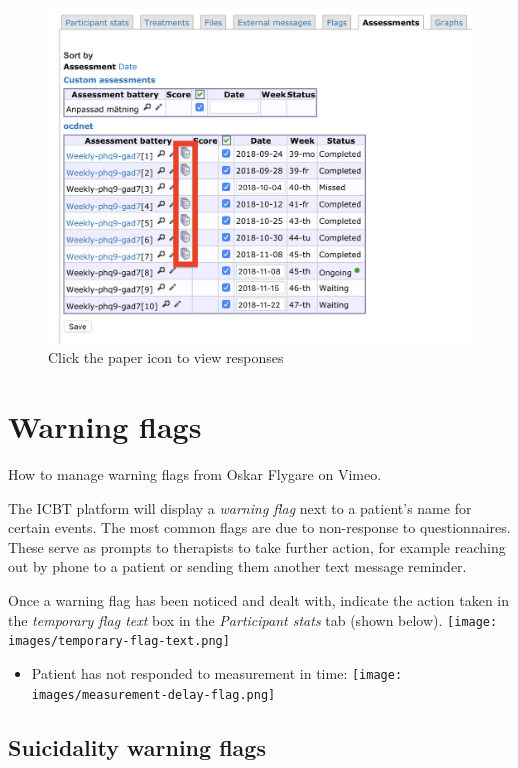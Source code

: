 \documentclass[]{book}
\providecommand{\tightlist}{%
  \setlength{\itemsep}{0pt}\setlength{\parskip}{0pt}}
\begin{document}
\begin{figure}
\centering
\includegraphics{images/assessments-list.png}
\caption{Click the paper icon to view responses}
\end{figure}

\hypertarget{warning-flags}{%
\section{Warning flags}\label{warning-flags}}

How to manage warning flags from Oskar Flygare on Vimeo.

The ICBT platform will display a \emph{warning flag} next to a patient's name for certain events. The most common flags are due to non-response to questionnaires. These serve as prompts to therapists to take further action, for example reaching out by phone to a patient or sending them another text message reminder.

Once a warning flag has been noticed and dealt with, indicate the action taken in the \emph{temporary flag text} box in the \emph{Participant stats} tab (shown below).
\texttt{[image: images/temporary-flag-text.png]}

\begin{itemize}
\tightlist
\item
  Patient has not responded to measurement in time: \texttt{[image: images/measurement-delay-flag.png]}
\end{itemize}

\hypertarget{suicidality-warning-flags}{%
\subsection{Suicidality warning flags}\label{suicidality-warning-flags}}
\end{document}
